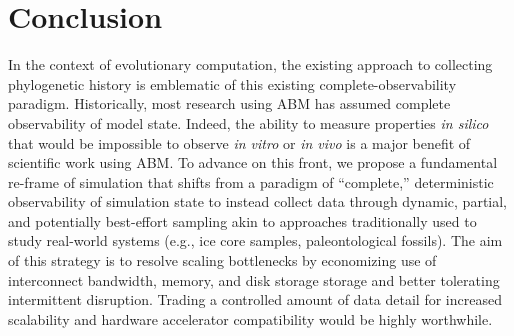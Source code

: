 \section{Conclusion} \label{sec:conclusion}

In the context of evolutionary computation, the existing approach to collecting phylogenetic history is emblematic of this existing complete-observability paradigm.
Historically, most research using ABM has assumed complete observability of model state.
Indeed, the ability to measure properties \textit{in silico} that would be impossible to observe \textit{in vitro} or \textit{in vivo} is a major benefit of scientific work using ABM.
To advance on this front, we propose a fundamental re-frame of simulation that shifts from a paradigm of ``complete,'' deterministic observability of simulation state to instead collect data through dynamic, partial, and potentially best-effort sampling akin to approaches traditionally used to study real-world systems (e.g., ice core samples, paleontological fossils).
The aim of this strategy is to resolve scaling bottlenecks by economizing use of interconnect bandwidth, memory, and disk storage storage and better tolerating intermittent disruption.
Trading a controlled amount of data detail for increased scalability and hardware accelerator compatibility would be highly worthwhile.
